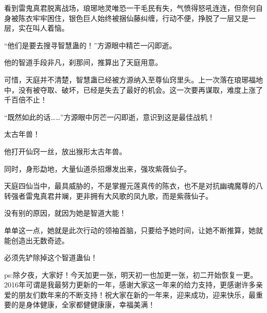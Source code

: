\begin{this_body}
看到雷鬼真君脱离战场，琅琊地灵唯恐一干毛民有失，气愤得怒吼连连，但奈何自身被陈衣牢牢困住，银色巨人始终被捆仙藤纠缠，行动不便，挣脱了一层又是一层，实在叫人着恼。

“他们是要去搜寻智慧蛊的！”方源眼中精芒一闪即逝。

他的智道手段非凡，刹那间，推算出了天庭用意。

可惜，天庭并不清楚，智慧蛊已经被方源纳入至尊仙窍里头。上一次落在琅琊福地中，没有被夺取、破坏，已经是失去了最好的机会。这一次要再谋取，难度上涨了千百倍不止！

“既然如此的话……”方源眼中厉芒一闪即逝，意识到这是最佳战机！

太古年兽！

他打开仙窍一丝，放出猴形太古年兽。

同时，身形勐地，大量仙道杀招爆发出来，强攻紫薇仙子。

天庭四仙当中，最具威胁的，不是掌握元莲真传的陈衣，也不是对抗幽魂魔尊的八转强者雷鬼真君井斓，更非拥有大风歌的凤九歌，而是紫薇仙子。

没有别的原因，就因为她是智道大能！

单单这一点，她就是此次行动的领袖首脑，只要给予她时间，让她不断推算，她就能创造出无数奇迹。

必须先铲除掉这个智道蛊仙！

ps:除夕夜，大家好！今天加更一张，明天初一也加更一张，初二开始恢复一更。2016年可谓是我最努力更新的一年，感谢大家这一年来的给力支持，更感谢许多亲爱的朋友们数年来的不断支持！祝大家在新的一年来，迎来成功，迎来快乐，最重要的是身体健康，全家都健健康康，幸福美满！

\end{this_body}

